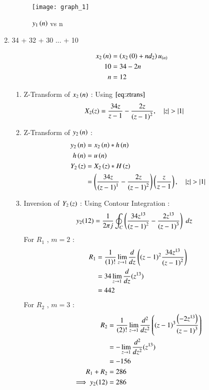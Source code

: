 \documentclass[journal,12pt,onecolumn]{IEEEtran}
\theoremstyle{remark}
\begin{document}
\begin{enumerate}
    \begin{figure}[h!]
    \centering
\graphicspath{ {figs/} }
\texttt{[image: graph\_1]}
\caption{ $y_1\left(n\right)$ vs n }
\label{graph:ee25-g2}
\end{figure}
\vspace{0.5cm}


\vspace{0.5cm}
\item
 34 + 32 + 30 ... + 10
\vspace{0.5cm}

\begin{align}
x_2\left(n\right) &= \left(x_2\left(0\right) + nd_2\right)u_{\left(n\right)}\\
     10 &= 34 -2n\\
     n &= 12 
     \end{align}

\begin{enumerate}
\item
Z-Transform of $x_2\left(n\right)$ :
Using $\eqref{eq:ztrans}$
\begin{align}
X_2(z)&= \frac{34z}{z-1}-
       \frac{2z}{\left(z-1\right)^{2}} \label{eq:ee25-6}
,\quad \left\vert z\right\vert>\left\vert1\right\vert 
\end{align}


\item
Z-Transform of $y_2\left(n\right)$ :
\begin{align}
    y_2\left(n\right) &= x_2\left(n\right) * h\left(n\right) \\
         h\left(n\right) &= u\left(n\right) \\
         Y_2\left(z\right) &= X_2\left(z\right) * H\left(z\right)\\
        &= \left(\frac{34z}{\left(z-1\right)^{1}}-
       \frac{2z}{\left(z-1\right)^2}\right)\left(\frac{z}{z-1}\right)
,\quad \left\vert z\right\vert>\left\vert1\right\vert 
    \end{align}

    \item
Inversion of $Y_2\left(z\right)$ :
 Using Contour Integration :
\begin{align}
    y_2{(12)}&=\frac{1}{2\pi j}\oint_{C}\left(\frac{34z^{13}}{\left(z-1\right)^2}-
       \frac{2z^{13}}{\left(z-1\right)^3}\right) \;dz 
\end{align}
For $R_1$ , $m=2$ :
\begin{align}
  R_1 &=\frac{1}{\left(1\right)!}\lim\limits_{z\to 1}\frac{d}{dz}\left({(z-1)}^{2}\frac{34z^{13}}{{(z-1)}^2}\right)   \\
    &=34\lim\limits_{z\to 1}\frac{d}{dz}(z^{13})   \\
    &= 442
    \end{align}
   For $R_2$ , $m=3$ :
    \begin{align}
    R_2 
&=\frac{1}{\left(2\right)!}\lim\limits_{z\to 1}\frac{d^{2}}{dz^{2}}\left({(z-1)}^{3}\frac{\left(-2z^{13}\right)}{{(z-1)}^3}\right)   \\
    &=-\lim\limits_{z\to 1}\frac{d^2}{dz^2}(z^{13})   \\
    &= -156\\
    R_1 + R_2 &= 286\\
    \implies  y_2{(12)} &= 286
\end{align}


\end{enumerate}
\end{enumerate}
\end{document}
